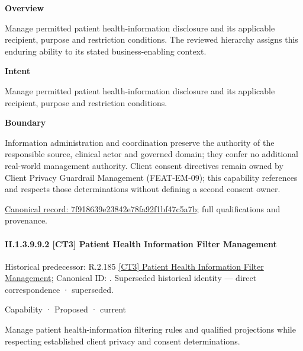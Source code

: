 \textbf{Overview}



Manage permitted patient health-information disclosure and its applicable recipient, purpose and restriction conditions. The reviewed hierarchy assigns this enduring ability to its stated business-enabling context.



\textbf{Intent}



Manage permitted patient health-information disclosure and its applicable recipient, purpose and restriction conditions.



\textbf{Boundary}



Information administration and coordination preserve the authority of the responsible source, clinical actor and governed domain; they confer no additional real-world management authority. Client consent directives remain owned by Client Privacy Guardrail Management (FEAT-EM-09); this capability references and respects those determinations without defining a second consent owner.


{\footnotesize \href{../../../../../../../continuum/strategy/capability/7f918639e23842e78fa92f1bf47c5a7b.md}{Canonical record: 7f918639e23842e78fa92f1bf47c5a7b}; full qualifications and provenance.}\par
\paragraph*{II.1.3.9.9.2 [CT3] Patient Health Information Filter Management}
\label{navigation:II.1.3.9.9.2}

{\small Historical predecessor: R.2.185 \hyperref[element:589f192797454d9e8960fb63774e5e9c]{[CT3] Patient Health Information Filter Management}; Canonical ID: \texttt{}. Superseded historical identity — direct correspondence · superseded.}\par
\label{element:62f673613c76494eba972cad3e4e8d0b}
{\small Capability · Proposed · current}\par

Manage patient health-information filtering rules and qualified projections while respecting established client privacy and consent determinations.



